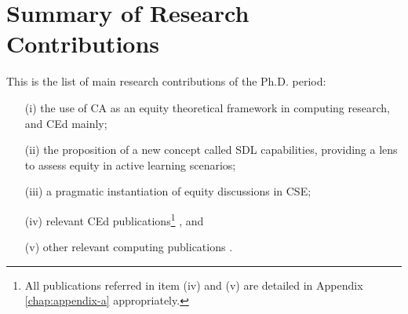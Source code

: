 \section{Summary of Research Contributions}
\label{intro-sec:sum-contributions}

This is the list of main research contributions of the \gls{Ph.D.} period:
\begin{enumerate}
    \item[(i)] the use of \acrfull{CA} as an equity theoretical framework in computing research, and \acrfull{CEd} mainly;
    \item[(ii)] the proposition of a new concept called \acrfull{SDL} capabilities, providing a lens to assess equity in active learning scenarios;
    \item[(iii)] a pragmatic instantiation of equity discussions in \acrfull{CSE};
    \item[(iv)] relevant \gls{CEd} publications\footnote{All publications referred in item (iv) and (v) are detailed in Appendix \ref{chap:appendix-a} appropriately.} \cite{bispojr:2024-isdls,bispojr:2024-nmp,bispojr:2024-gdec,bispojr:2024-urca,   feitosa:2024,cavalcanti:2024,pereira:2024,melo:2024-horizontes,boaventura:2024-sbgames,boaventura:2023,esmeraldo:2023,freire:2023-rsc,freire:2023-encompif, santos:2022,bispojr:2022-educomp,esmeraldo:2022,bispojr:2021,bispojr:2021-educomp,bispojr:2021-wei,bispojr:2020-tec}, and
    \item[(v)] other relevant computing publications \cite{bispojr:2024-online-lab,cavalcanti:2024-ieee,bispojr:2023-edi,bispojr:2023-rbie,sansil:2023,bispojr:2022-snee,lima:2022}.
\end{enumerate}

                

        

        
